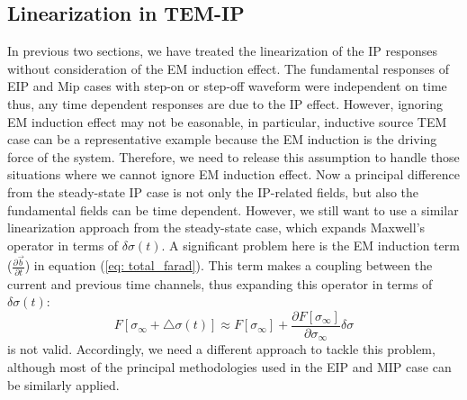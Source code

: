 \documentclass[a4paper, 11pt]{article}
\newcommand{\siginf}{\sigma_\infty}
\newcommand{\dsig}{\triangle\sigma}
\renewcommand {\b}  { {\vec b} }
\newcommand{\sigpert}{\delta\sigma}
\begin{document}
\subsection{Linearization in TEM-IP}
In previous two sections, we have treated the linearization of the IP responses without consideration of the EM induction effect. The fundamental responses of EIP and Mip cases with step-on or step-off waveform were independent on time thus, any time dependent responses are due to the IP effect. However, ignoring EM induction effect may not be easonable, in particular, inductive source TEM case can be a representative example because the EM induction is the driving force of the system. Therefore, we need to release this assumption to handle those situations where we cannot ignore EM induction effect. Now a principal difference from the steady-state IP case is not only the IP-related fields, but also the fundamental fields can be time dependent. However, we still want to use a similar linearization approach from the steady-state case, which expands Maxwell's operator in terms of $\sigpert(t)$. A significant problem here is the EM induction term ($\frac{\partial \b}{\partial t}$) in equation (\ref{eq: total_farad}). This term makes a coupling between the current and previous time channels, thus expanding this operator in terms of $\sigpert(t)$:
\begin{equation*}
  F[\siginf+\dsig(t)] \approx F[\siginf] + \frac{\partial F[\siginf]}{\partial \siginf}\sigpert
\end{equation*}
is not valid. Accordingly, we need a different approach to tackle this problem, although most of the principal methodologies used in the EIP and MIP case can be similarly applied.
\end{document}
